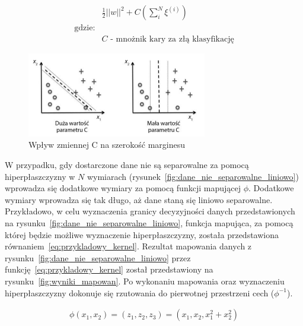 \begin{equation}
    \begin{aligned}
        &\frac{1}{2}||w||^2 + C (\sum_{i}^{N} \xi^{(i)})\\
        \text{gdzie:} \\
        &C \text{ - mnożnik kary za złą klasyfikację}
    \end{aligned}
    \label{eq:hard_svm_min_problem}
\end{equation}

\begin{figure}[]
    \centering
    \includegraphics[width=0.7\textwidth]{images/wplyw_c_na_svm}
    \caption{  Wpływ zmiennej C na szerokość marginesu }
    \label{fig:wplyw_c_na_svm}
\end{figure}

\bigskip

W przypadku, gdy dostarczone dane nie są separowalne za pomocą hiperpłaszczyzny
w $N$ wymiarach (rysunek~\ref{fig:dane_nie_separowalne_liniowo})
wprowadza się dodatkowe wymiary za pomocą funkcji mapującej $\phi$.
Dodatkowe wymiary wprowadza się tak długo, aż dane staną się liniowo separowalne.
Przykładowo, w celu wyznaczenia granicy decyzyjności danych
przedstawionych na rysunku~\ref{fig:dane_nie_separowalne_liniowo},
funkcja mapująca, za pomocą której będzie możliwe wyznaczenie hiperpłaszczyzny,
została przedstawiona równaniem~\ref{eq:przykladowy_kernel}.
Rezultat mapowania danych z rysunku~\ref{fig:dane_nie_separowalne_liniowo} przez funkcję~\ref{eq:przykladowy_kernel}
został przedstawiony na rysunku~\ref{fig:wyniki_mapowan}.
Po wykonaniu mapowania oraz wyznaczeniu hiperpłaszczyzny dokonuje się rzutowania do pierwotnej przestrzeni cech ($\phi^{-1}$).

\begin{equation}
    \begin{aligned}
        \phi(x_1, x_2) = (z_1, z_2, z_3) = (x_1, x_2, x_1^2 + x_2^2)
    \end{aligned}
    \label{eq:przykladowy_kernel}
\end{equation}

